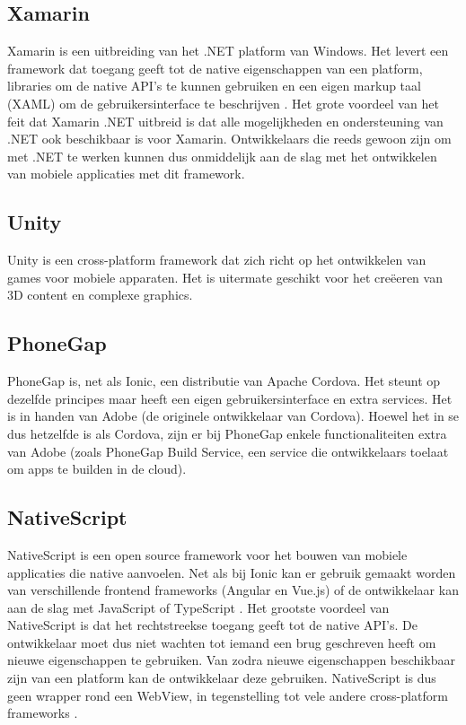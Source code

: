 \subsection{Xamarin}

Xamarin is een uitbreiding van het .NET platform van Windows. Het levert een framework dat toegang geeft tot de native eigenschappen van een platform, libraries om de native API's te kunnen gebruiken en een eigen markup taal (XAML) om de gebruikersinterface te beschrijven \autocite{Microsoft2020}. Het grote voordeel van het feit dat Xamarin .NET uitbreid is dat alle mogelijkheden en ondersteuning van .NET ook beschikbaar is voor Xamarin. Ontwikkelaars die reeds gewoon zijn om met .NET te werken kunnen dus onmiddelijk aan de slag met het ontwikkelen van mobiele applicaties met dit framework.

\subsection{Unity}

Unity is een cross-platform framework dat zich richt op het ontwikkelen van games voor mobiele apparaten. Het is uitermate geschikt voor het creëeren van 3D content en complexe graphics. 

\subsection{PhoneGap}

PhoneGap is, net als Ionic, een distributie van Apache Cordova. Het steunt op dezelfde principes maar heeft een eigen gebruikersinterface en extra services. Het is in handen van Adobe (de originele ontwikkelaar van Cordova). Hoewel het in se dus hetzelfde is als Cordova, zijn er bij PhoneGap enkele functionaliteiten extra van Adobe (zoals PhoneGap Build Service, een service die ontwikkelaars toelaat om apps te builden in de cloud).

\subsection{NativeScript} 

NativeScript is een open source framework voor het bouwen van mobiele applicaties die native aanvoelen. Net als bij Ionic kan er gebruik gemaakt worden van verschillende frontend frameworks (Angular en Vue.js) of de ontwikkelaar kan aan de slag met JavaScript of TypeScript \autocite{NativeScript2020}. Het grootste voordeel van NativeScript is dat het rechtstreekse toegang geeft tot de native API's. De ontwikkelaar moet dus niet wachten tot iemand een brug geschreven heeft om nieuwe eigenschappen te gebruiken. Van zodra nieuwe eigenschappen beschikbaar zijn van een platform kan de ontwikkelaar deze gebruiken. NativeScript is dus geen wrapper rond een WebView, in tegenstelling tot vele andere cross-platform frameworks \autocite{Anderson2016}.

